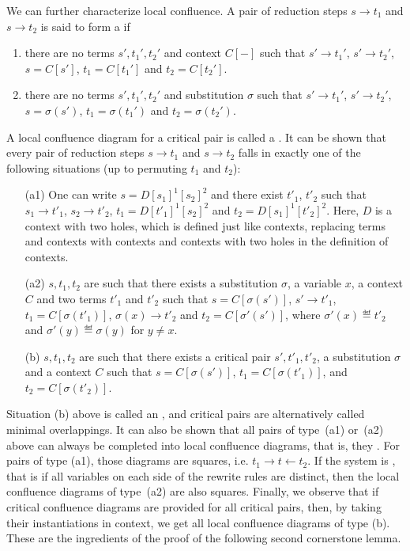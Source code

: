 We can further characterize local confluence. 
A pair of reduction steps $s \to t_1$ and $s\to t_2$ is said to form a    if 
\begin{enumerate}
  \item there are no terms $s',t_1',t_2'$ and context $C[-]$ such that $s' \to t_1'$, $s' \to t_2'$, $s=C[s']$, $t_1=C[t_1']$ and $t_2=C[t_2']$.
  \item there are no terms $s',t_1',t_2'$ and substitution $\sigma$ such that $s' \to t_1'$, $s' \to t_2'$, $s=\sigma(s')$, $t_1=\sigma(t_1')$ and $t_2=\sigma(t_2')$.
\end{enumerate}
A local confluence diagram  for a critical pair is called a .
It can be shown that every pair of reduction steps  $s \to t_1$ and $s\to t_2$ falls in exactly one of the following situations (up to permuting $t_1$ and $t_2$):
\begin{enumerate}
\item[(a1)] One can write $s=D[s_1]^1[s_2]^2$ and there exist $t'_1$, $t'_2$ such that $s_1\to t'_1$, $s_2\to t'_2$, $t_1=D[t'_1]^1[s_2]^2$ and $t_2=D[s_1]^1[t'_2]^2$. 
Here, $D$ is a context with two holes, which is defined just like contexts, replacing terms and contexts with contexts and contexts with two holes in the definition of contexts.
\item[(a2)] $s,t_1,t_2$ are such that there exists a substitution $\sigma$, a variable $x$, a context $C$  and two terms $t'_1$ and $t'_2$ such that
$s=C[\sigma(s')]$, $s'\to t'_1$, $t_1=C[\sigma(t'_1)]$, $\sigma(x)\to t'_2$ and 
$t_2=C[\sigma'(s')]$, where $\sigma'(x)\eqdef t'_2$ and $\sigma'(y)\eqdef \sigma(y)$ for $y\not = x$.
\item[(b)] $s,t_1,t_2$ are such that there exists a critical pair $s',t'_1,t'_2$, a substitution $\sigma$ and a context $C$ such that $s=C[\sigma(s')]$, $t_1=C[\sigma(t'_1)]$, and $t_2=C[\sigma(t'_2)]$.
\end{enumerate}
Situation (b) above is called an , and critical pairs are alternatively called minimal overlappings.
It can also be shown that all pairs of type~(a1) or~(a2) above can always be completed into local confluence diagrams, that is, they . 
For pairs of type (a1), those  diagrams are squares, i.e. $t_1 \to t \leftarrow t_2$. 
If the system is , that is if all variables on each side of the rewrite rules are distinct, then the local confluence diagrams of type~(a2) are also squares.
Finally, we observe that if critical confluence diagrams are provided for all critical pairs, then, by taking their instantiations in context, we get all local confluence diagrams of type (b).  These are the ingredients of the proof of the following second cornerstone lemma.

